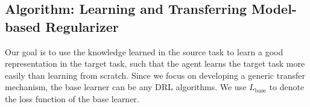 





\subsection{Algorithm: Learning and Transferring Model-based Regularizer}
\label{sec:algo}
Our goal is to use the knowledge learned in the source task to learn a good representation in the target task, such that the agent learns the target task more easily than learning from scratch.
Since we focus on developing a generic transfer mechanism, the base learner can be any DRL algorithms. We use $L_{\text{base}}$ to denote the loss function of the base learner. 


